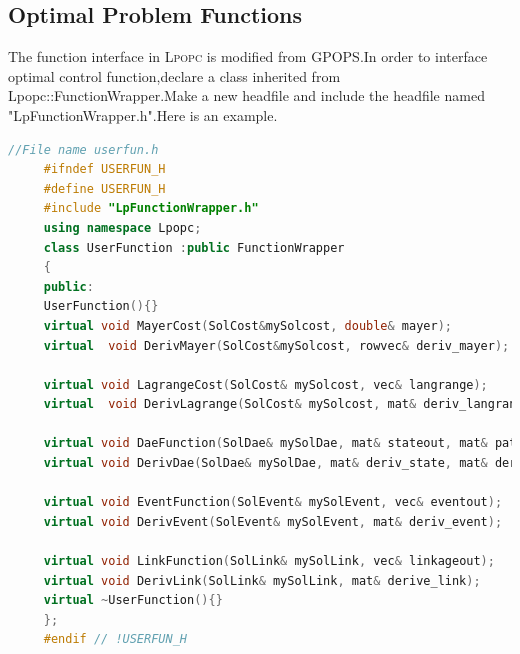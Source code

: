 \documentclass[10pt]{article}
\newcommand{\LPOPC}{\textsc{Lpopc}\xspace}
\begin{document}
	\subsection{Optimal Problem Functions}
	The function interface in \LPOPC is modified from GPOPS.In order to interface  optimal control function,declare a class inherited from Lpopc::FunctionWrapper.Make a new headfile and include the headfile named "LpFunctionWrapper.h".Here is an example.
	 \begin{lstlisting}[language=C++]
	 //File name userfun.h
	 #ifndef USERFUN_H
	 #define USERFUN_H
	 #include "LpFunctionWrapper.h"
	 using namespace Lpopc;
	 class UserFunction :public FunctionWrapper
	 {
	 public:
	 UserFunction(){}
	 virtual void MayerCost(SolCost&mySolcost, double& mayer);
	 virtual  void DerivMayer(SolCost&mySolcost, rowvec& deriv_mayer);
	 
	 virtual void LagrangeCost(SolCost& mySolcost, vec& langrange);
	 virtual  void DerivLagrange(SolCost& mySolcost, mat& deriv_langrange);
	 
	 virtual void DaeFunction(SolDae& mySolDae, mat& stateout, mat& pathout);
	 virtual void DerivDae(SolDae& mySolDae, mat& deriv_state, mat& deriv_path);
	 
	 virtual void EventFunction(SolEvent& mySolEvent, vec& eventout);
	 virtual void DerivEvent(SolEvent& mySolEvent, mat& deriv_event);
	 
	 virtual void LinkFunction(SolLink& mySolLink, vec& linkageout);
	 virtual void DerivLink(SolLink& mySolLink, mat& derive_link);
	 virtual ~UserFunction(){}
	 };
	 #endif // !USERFUN_H
	 \end{lstlisting}
\end{document}

